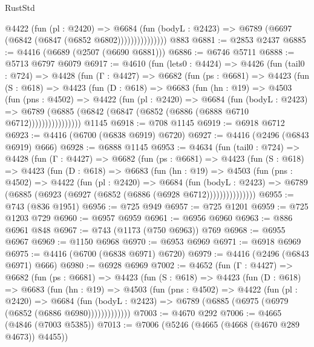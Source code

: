 \begin{lexlean}{RustStd}
\begin{coremodule}
                    @4422
                      (fun (pl : @2420) =>
                      @6684
                        (fun (bodyL : @2423) =>
                        @6789 (@6697 (@6842 (@6847 (@6852 @6802)))))))))))))))
    @883
@6881 := @2853 @2437
@6885 := @4416 (@6689 (@2507 (@6690 @6881)))
@6886 := @6746 @5711
@6888 := @5713 @6797 @6079
@6917 := @4610
    (fun (lets0 : @4424) =>
    @4426
      (fun (tail0 : @724) =>
      @4428
        (fun (Γ : @4427) =>
        @6682
          (fun (ps : @6681) =>
          @4423
            (fun (S : @618) =>
            @4423
              (fun (D : @618) =>
              @6683
                (fun (hn : @19) =>
                @4503
                  (fun (pns : @4502) =>
                  @4422
                    (fun (pl : @2420) =>
                    @6684
                      (fun (bodyL : @2423) =>
                      @6789 (@6885 (@6842 (@6847 (@6852 (@6886 (@6888 @6710 @6712))))))))))))))))
    @1145
@6918 := @708 @1145
@6919 := @6918 @6712
@6923 := @4416 (@6700 (@6838 @6919) @6720)
@6927 := @4416 (@2496 (@6843 @6919) @666)
@6928 := @6888 @1145
@6953 := @4634
    (fun (tail0 : @724) =>
    @4428
      (fun (Γ : @4427) =>
      @6682
        (fun (ps : @6681) =>
        @4423
          (fun (S : @618) =>
          @4423
            (fun (D : @618) =>
            @6683
              (fun (hn : @19) =>
              @4503
                (fun (pns : @4502) =>
                @4422
                  (fun (pl : @2420) =>
                  @6684
                    (fun (bodyL : @2423) =>
                    @6789 (@6885 (@6923 (@6927 (@6852 (@6886 (@6928 @6712)))))))))))))))
@6955 := @743 (@836 @1951)
@6956 := @725 @949
@6957 := @725 @1201
@6959 := @725 @1203 @729
@6960 := @6957 @6959
@6961 := @6956 @6960
@6963 := @886 @6961 @848
@6967 := @743 (@1173 (@750 @6963)) @769
@6968 := @6955 @6967
@6969 := @1150 @6968
@6970 := @6953 @6969
@6971 := @6918 @6969
@6975 := @4416 (@6700 (@6838 @6971) @6720)
@6979 := @4416 (@2496 (@6843 @6971) @666)
@6980 := @6928 @6969
@7002 := @4652
    (fun (Γ : @4427) =>
    @6682
      (fun (ps : @6681) =>
      @4423
        (fun (S : @618) =>
        @4423
          (fun (D : @618) =>
          @6683
            (fun (hn : @19) =>
            @4503
              (fun (pns : @4502) =>
              @4422
                (fun (pl : @2420) =>
                @6684
                  (fun (bodyL : @2423) =>
                  @6789 (@6885 (@6975 (@6979 (@6852 (@6886 @6980)))))))))))))
@7003 := @4670 @292
@7006 := @4665 (@4846 (@7003 @5385))
@7013 := @7006 (@5246 (@4665 (@4668 (@4670 @289 @4673)) @4455))

\end{coremodule}
\end{lexlean}

